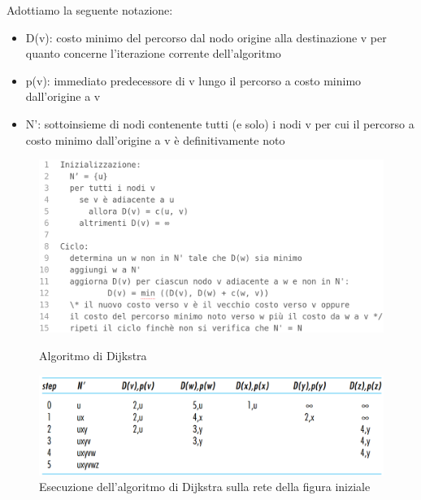 \documentclass[11pt,a4paper]{book}
\begin{document}
Adottiamo la seguente notazione:
\begin{itemize}
	\item D(v): costo minimo del percorso dal nodo origine alla destinazione v per quanto concerne l'iterazione corrente dell'algoritmo
	\item p(v): immediato predecessore di v lungo il percorso a costo minimo dall'origine a v
	\item N': sottoinsieme di nodi contenente tutti (e solo) i nodi v per cui il percorso a costo minimo dall'origine a v è definitivamente noto
\end{itemize}
\begin{figure}
	\includegraphics[scale=0.4]{img/060.png}
	\caption{Algoritmo di Dijkstra}
	\includegraphics[scale=0.45]{img/061.png}
	\caption{Esecuzione dell'algoritmo di Dijkstra sulla rete della figura iniziale}
\end{figure}
\end{document}
